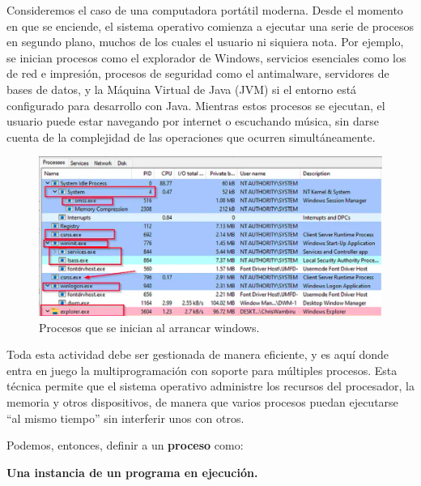 Consideremos el caso de una computadora portátil moderna. Desde el momento en que se enciende, el sistema operativo comienza a ejecutar una serie de procesos en segundo plano, muchos de los cuales el usuario ni siquiera nota. Por ejemplo, se inician procesos como el explorador de Windows, servicios esenciales como los de red e impresión, procesos de seguridad como el antimalware, servidores de bases de datos, y la Máquina Virtual de Java (JVM) si el entorno está configurado para desarrollo con Java. Mientras estos procesos se ejecutan, el usuario puede estar navegando por internet o escuchando música, sin darse cuenta de la complejidad de las operaciones que ocurren simultáneamente.
\begin{figure}[H]
	\centering
	\includegraphics[width=0.8\linewidth]{Imagenes/procesos.png}
	\caption{Procesos que se inician al arrancar windows. }
	\label{fig:enter-label}
\end{figure}

Toda esta actividad debe ser gestionada de manera eficiente, y es aquí donde entra en juego la multiprogramación con soporte para múltiples procesos. Esta técnica permite que el sistema operativo administre los recursos del procesador, la memoria y otros dispositivos, de manera que varios procesos puedan ejecutarse ``al mismo tiempo'' sin interferir unos con otros.

Podemos, entonces, definir a un \textbf{proceso} como:

\begin{tcolorbox}
	\textbf{Una instancia de un programa en ejecución.}
\end{tcolorbox}

